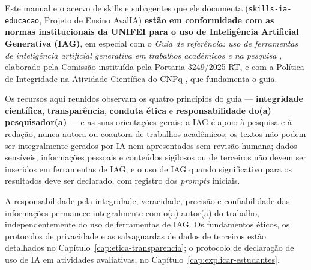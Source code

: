 \documentclass[12pt,openright,twoside,a4paper,english,brazil]{memoir}
\begin{document}
\begin{conformidade}
\small
Este manual e o acervo de skills e subagentes que ele documenta
(\texttt{skills-ia-educacao}, Projeto de Ensino AvalIA) \textbf{est{\~a}o em
conformidade com as normas institucionais da UNIFEI para o uso de
Intelig{\^e}ncia Artificial Generativa (IAG)}, em especial com o
\emph{Guia de refer{\^e}ncia: uso de ferramentas de intelig{\^e}ncia artificial
generativa em trabalhos acad{\^e}micos e na pesquisa} \cite{unifei2026guia},
elaborado pela Comiss{\~a}o institu{\'i}da pela Portaria 3249/2025-RT, e com a
Pol{\'i}tica de Integridade na Atividade Cient{\'i}fica do CNPq
\cite{cnpq2026integridade}, que fundamenta o guia.

\vspace{0.3em}
Os recursos aqui reunidos observam os quatro princ{\'i}pios do guia ---
\textbf{integridade cient{\'i}fica}, \textbf{transpar{\^e}ncia},
\textbf{conduta {\'e}tica} e \textbf{responsabilidade do(a) pesquisador(a)} ---
e as suas orientações gerais: a IAG {\'e} apoio {\`a} pesquisa e {\`a} reda{\c c}{\~a}o,
nunca autora ou coautora de trabalhos acad{\^e}micos; os textos n{\~a}o podem ser
integralmente gerados por IA nem apresentados sem revis{\~a}o humana; dados
sens{\'i}veis, informa{\c c}{\~o}es pessoais e conte{\'u}dos sigilosos ou de terceiros
n{\~a}o devem ser inseridos em ferramentas de IAG; e o uso de IAG quando
significativo para os resultados deve ser declarado, com registro dos
\emph{prompts} iniciais.

\vspace{0.3em}
A responsabilidade pela integridade, veracidade, precis{\~a}o e
confiabilidade das informa{\c c}{\~o}es permanece integralmente com o(a) autor(a)
do trabalho, independentemente do uso de ferramentas de IAG. Os fundamentos
{\'e}ticos, os protocolos de privacidade e as salvaguardas de dados de
terceiros est{\~a}o detalhados no Cap{\'i}tulo~\ref{cap:etica-transparencia}; o
protocolo de declara{\c c}{\~a}o de uso de IA em atividades avaliativas, no
Cap{\'i}tulo~\ref{cap:explicar-estudantes}.
\end{conformidade}

\clearpage

\tableofcontents*
\clearpage

\mainmatter












\appendix



\backmatter

\end{document}
